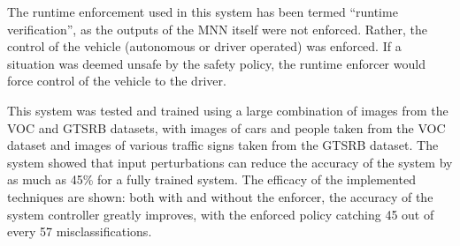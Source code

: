 The runtime enforcement used in this system has been termed ``runtime verification'', as the outputs of the \ac{MNN} itself were not enforced.
Rather, the control of the vehicle (autonomous or driver operated) was enforced.
If a situation was deemed unsafe by the safety policy, the runtime enforcer would force control of the vehicle to the driver.

This system was tested and trained using a large combination of images from the \ac{VOC} and \ac{GTSRB} datasets, with images of cars and people taken from the \ac{VOC} dataset and images of various traffic signs taken from the \ac{GTSRB} dataset.
The system showed that input perturbations can reduce the accuracy of the system by as much as 45\% for a fully trained system.
The efficacy of the implemented techniques are shown: both with and without the enforcer, the accuracy of the system controller greatly improves, with the enforced policy catching 45 out of every 57 misclassifications.

























